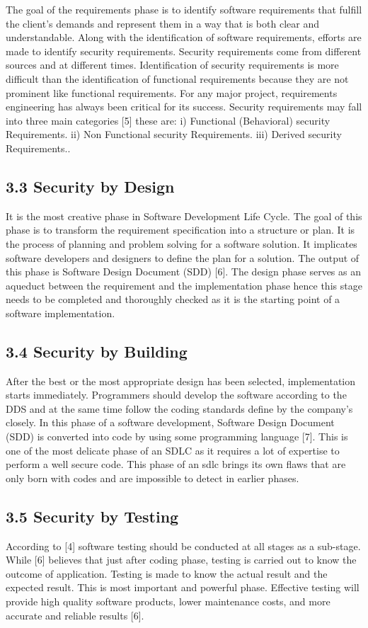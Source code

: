 \documentclass[12pt]{extreport}
\begin{document}
The goal of the requirements phase is to identify software requirements that fulfill the client’s demands and represent them in a way that is both clear and understandable. Along with the identification of software requirements, efforts are made to identify security requirements. Security requirements come from different sources and at different times. Identification of security requirements is more difficult than the identification of functional requirements because they are not prominent like functional requirements. For any major project, requirements engineering has always been critical for its success. Security requirements may fall into three main categories [5] these are: i) Functional (Behavioral) security Requirements. ii) Non Functional security Requirements. iii) Derived security Requirements..

\subsection*{3.3	Security by Design}
It is the most creative phase in Software Development Life Cycle. The goal of this phase is to transform the requirement specification into a structure or plan. It is the process of planning and problem solving for a software solution. It implicates software developers and designers to define the plan for a solution.  The output of this phase is Software Design Document (SDD) [6]. The design phase serves as an aqueduct between the requirement and the implementation phase hence this stage needs to be completed and thoroughly checked as it is the starting point of a software implementation. 

\subsection*{3.4	Security by Building}
After the best or the most appropriate design has been selected, implementation starts immediately. Programmers should develop the software according to the DDS and at the same time follow the coding standards define by the company's closely. In this phase of a software development, Software Design Document (SDD) is converted into code by using some programming language [7]. This is one of the most delicate phase of an SDLC as it requires a lot of expertise to perform a well secure code. This phase of an sdlc brings its own flaws that are only born with codes and are impossible to detect in earlier phases.

\subsection*{3.5	Security by Testing}
According to [4] software testing should be conducted at all stages as a sub-stage. While [6] believes that just after coding phase, testing is carried out to know the outcome of application. Testing is made to know the actual result and the expected result. This is most important and powerful phase.  Effective testing will provide high quality software products, lower maintenance costs, and more accurate and reliable results [6].
\end{document}

